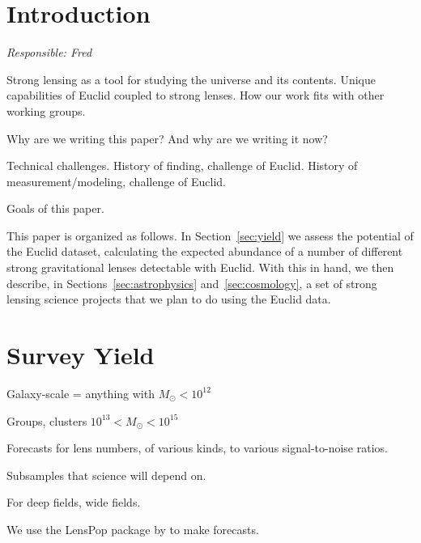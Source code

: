 \documentclass[twocolumn]{svjour3}
\begin{document}

\section{Introduction}

{\it Responsible: Fred}

Strong lensing as a tool for studying the universe and its contents.
Unique capabilities of Euclid coupled to strong lenses. How our  work
fits with other working groups.

Why are we writing this paper? And why are we writing it now?

Technical challenges. History of finding, challenge of Euclid. History
of  measurement/modeling, challenge of Euclid.

Goals of this paper.

This paper is organized as follows. In Section~\ref{sec:yield} we assess
the  potential of the Euclid dataset, calculating the expected abundance
of a  number of different strong gravitational lenses detectable with
Euclid. With  this in hand, we then  describe, in
Sections~\ref{sec:astrophysics} and~\ref{sec:cosmology}, a set  of
strong lensing science projects that we plan to do using the Euclid
data.


\section{Survey Yield}



Galaxy-scale = anything with $ M_{\odot} < 10^{12}$

Groups, clusters $ 10^{13}< M_{\odot} < 10^{15}$

Forecasts for lens numbers, of various kinds, to various signal-to-noise ratios.

Subsamples that science will depend on.

For deep fields, wide fields.

We use the {\sc LensPop} package by \citet{Collett2015} to make
forecasts.

\end{document}
